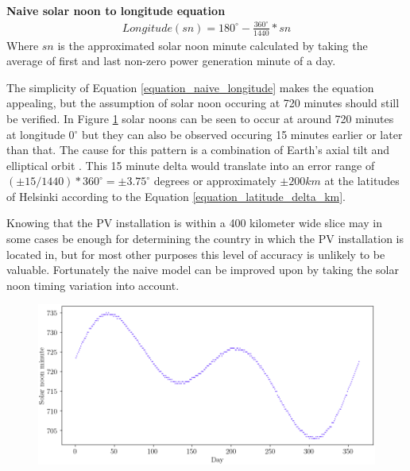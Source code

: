 \noindent\textbf{Naive solar noon to longitude equation}
%
\begin{equation}
\begin{split}
\label{equation_naive_longitude}
Longitude(sn)=180^\circ-\frac{360^\circ}{1440}*sn
\end{split}
\end{equation}
Where $sn$ is the approximated solar noon minute calculated by taking the average of first and last non-zero power generation minute of a day. %

\hfill \break


\noindent The simplicity of Equation \ref{equation_naive_longitude} makes the equation appealing, but the assumption of solar noon occuring at 720 minutes should still be verified. In Figure \ref{fig_solarnoons} solar noons can be seen to occur at around 720 minutes at longitude 0$^\circ$ but they can also be observed occuring 15 minutes earlier or later than that. The cause for this pattern is a combination of Earth's axial tilt and elliptical orbit \cite{eot}. This 15 minute delta would translate into an error range of $(\pm 15/1440)*360^\circ = \pm 3.75^\circ$ degrees or approximately $\pm 200 km$ at the latitudes of Helsinki according to the Equation \ref{equation_latitude_delta_km}.


Knowing that the PV installation is within a 400 kilometer wide slice may in some cases be enough for determining the country in which the PV installation is located in, but for most other purposes this level of accuracy is unlikely to be valuable. Fortunately the naive model can be improved upon by taking the solar noon timing variation into account.

\hfill \break

\begin{figure}[ht!]
\centering
\includegraphics[width=1\linewidth]{pics/solarnoons2}
\label{fig_solarnoons}
\end{figure}



